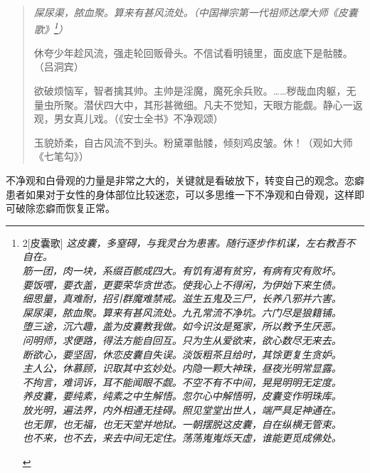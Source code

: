 \begin{quotation}\it
    屎尿渠，脓血聚。算来有甚风流处。（中国禅宗第一代祖师达摩大师《皮囊歌》\footnote{\setlength{\columnseprule}{0.4pt}
        \begin{multicols}{2}[\centering 皮囊歌]\it
            \centering
            这皮囊，多窒碍，与我灵台为患害。随行逐步作机谋，左右教吾不自在。\\ 筋一团，肉一块，系缀百骸成四大。有饥有渴有贫穷，有病有灾有败坏。\\ 要饭喂，要衣盖，更要荣华贪世态。使我心上不得闲，为伊始下来生债。\\ 细思量，真难耐，招引群魔难禁戒。滋生五鬼及三尸，长养八邪并六害。\\ 屎尿渠，脓血聚。算来有甚风流处。九孔常流不净坑。六门尽是狼籍铺。\\ 堕三途，沉六趣，盖为皮囊教我做。如今识汝是冤家，所以教予生厌恶。\\ 问明师，求便路，得法方能自回互。只为生从爱欲来，欲心数尽无来去。\\ 断欲心，要坚固，休恋皮囊自失误。淡饭粗茶且给时，其馀更复生贪妒。\\ 主人公，休慕顾，识取其中玄妙处。内隐一颗大神珠，昼夜光明常显露。\\ 不拘言，难词诉，耳不能闻眼不觑。不空不有不中间，晃晃明明无定度。\\ 养皮囊，要纯素，纯素之中生解悟。忽尔心中解悟明，皮囊变作明珠库。\\ 放光明，遍法界，内外相通无挂碍。照见堂堂出世人，端严具足神通在。\\ 也无罪，也无福，也无天堂并地狱。一朝摆脱这皮囊，自在纵横无管束。\\ 也不来，也不去，来去中间无定住。荡荡嵬嵬烁天虚，谁能更觅成佛处。
        \end{multicols}}）

    休夸少年趁风流，强走轮回贩骨头。不信试看明镜里，面皮底下是骷髅。（吕洞宾）

    欲破烦恼军，智者擒其帅。主帅是淫魔，魔死余兵败。……秽哉血肉躯，无量虫所聚。潜伏四大中，其形甚微细。凡夫不觉知，天眼方能觑。静心一返观，男女真儿戏。（《安士全书》不净观颂）

    玉貌娇柔，自古风流不到头。粉黛罩骷髅，倾刻鸡皮皱。休！（观如大师《七笔勾》）
\end{quotation}

不净观和白骨观的力量是非常之大的，关键就是看破放下，转变自己的观念。恋癖患者如果对于女性的身体部位比较迷恋，可以多思维一下不净观和白骨观，这样即可破除恋癖而恢复正常。


